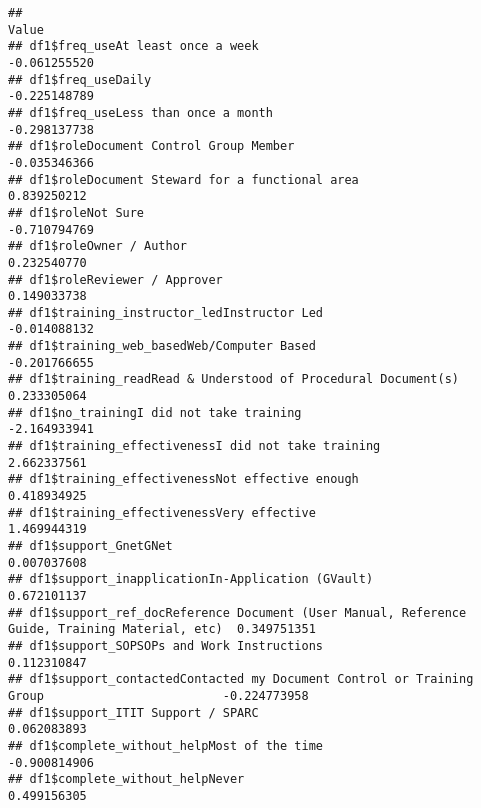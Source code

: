 \documentclass[
]{article}
\begin{document}
\begin{verbatim}
##                                                                                                     Value
## df1$freq_useAt least once a week                                                             -0.061255520
## df1$freq_useDaily                                                                            -0.225148789
## df1$freq_useLess than once a month                                                           -0.298137738
## df1$roleDocument Control Group Member                                                        -0.035346366
## df1$roleDocument Steward for a functional area                                                0.839250212
## df1$roleNot Sure                                                                             -0.710794769
## df1$roleOwner / Author                                                                        0.232540770
## df1$roleReviewer / Approver                                                                   0.149033738
## df1$training_instructor_ledInstructor Led                                                    -0.014088132
## df1$training_web_basedWeb/Computer Based                                                     -0.201766655
## df1$training_readRead & Understood of Procedural Document(s)                                  0.233305064
## df1$no_trainingI did not take training                                                       -2.164933941
## df1$training_effectivenessI did not take training                                             2.662337561
## df1$training_effectivenessNot effective enough                                                0.418934925
## df1$training_effectivenessVery effective                                                      1.469944319
## df1$support_GnetGNet                                                                          0.007037608
## df1$support_inapplicationIn-Application (GVault)                                              0.672101137
## df1$support_ref_docReference Document (User Manual, Reference Guide, Training Material, etc)  0.349751351
## df1$support_SOPSOPs and Work Instructions                                                     0.112310847
## df1$support_contactedContacted my Document Control or Training Group                         -0.224773958
## df1$support_ITIT Support / SPARC                                                              0.062083893
## df1$complete_without_helpMost of the time                                                    -0.900814906
## df1$complete_without_helpNever                                                                0.499156305

\end{verbatim}
\end{document}
